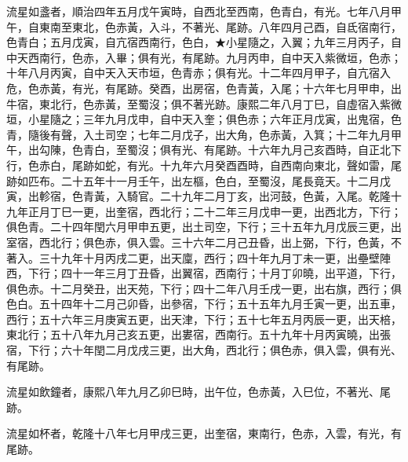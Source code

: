 \begin{pinyinscope}
流星如盞者，順治四年五月戊午寅時，自西北至西南，色青白，有光。七年八月甲午，自東南至東北，色赤黃，入斗，不著光、尾跡。八年四月己酉，自氐宿南行，色青白；五月戊寅，自亢宿西南行，色白，★小星隨之，入翼；九年三月丙子，自中天西南行，色赤，入畢；俱有光，有尾跡。九月丙申，自中天入紫微垣，色赤；十年八月丙寅，自中天入天市垣，色青赤；俱有光。十二年四月甲子，自亢宿入危，色赤黃，有光，有尾跡。癸酉，出房宿，色青黃，入尾；十六年七月甲申，出牛宿，東北行，色赤黃，至蜀沒；俱不著光跡。康熙二年八月丁巳，自虛宿入紫微垣，小星隨之；三年九月戊申，自中天入奎；俱色赤；六年正月戊寅，出鬼宿，色青，隨後有聲，入土司空；七年二月戊子，出大角，色赤黃，入箕；十二年九月甲午，出勾陳，色青白，至蜀沒；俱有光、有尾跡。十六年九月己亥酉時，自正北下行，色赤白，尾跡如蛇，有光。十九年六月癸酉酉時，自西南向東北，聲如雷，尾跡如匹布。二十五年十一月壬午，出左樞，色白，至蜀沒，尾長竟天。十二月戊寅，出軫宿，色青黃，入騎官。二十九年二月丁亥，出河鼓，色黃，入尾。乾隆十九年正月丁巳一更，出奎宿，西北行；二十二年三月戊申一更，出西北方，下行；俱色青。二十四年閏六月甲申五更，出土司空，下行；三十五年九月戊辰三更，出室宿，西北行；俱色赤，俱入雲。三十六年二月己丑昏，出上弼，下行，色黃，不著入。三十九年十月丙戌二更，出天廩，西行；四十年九月丁未一更，出壘壁陣西，下行；四十一年三月丁丑昏，出翼宿，西南行；十月丁卯曉，出平道，下行，俱色赤。十二月癸丑，出天苑，下行；四十二年八月壬戌一更，出右旗，西行；俱色白。五十四年十二月己卯昏，出參宿，下行；五十五年九月壬寅一更，出五車，西行；五十六年三月庚寅五更，出天津，下行；五十七年五月丙辰一更，出天棓，東北行；五十八年九月己亥五更，出婁宿，西南行。五十九年十月丙寅曉，出張宿，下行；六十年閏二月戊戌三更，出大角，西北行；俱色赤，俱入雲，俱有光、有尾跡。

流星如飲鐘者，康熙八年九月乙卯巳時，出午位，色赤黃，入巳位，不著光、尾跡。

流星如杯者，乾隆十八年七月甲戌三更，出奎宿，東南行，色赤，入雲，有光，有尾跡。


\end{pinyinscope}
